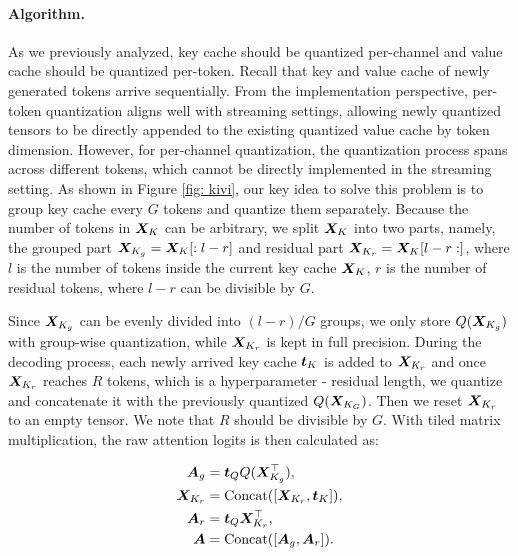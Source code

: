 \paragraph{Algorithm.}
As we previously analyzed, key cache should be quantized per-channel and value cache should be quantized per-token.
Recall that key and value cache of newly generated tokens arrive sequentially.
From the implementation perspective, per-token quantization aligns well with streaming settings, allowing newly quantized tensors to be directly appended to the existing quantized value cache by token dimension.
However, for per-channel quantization, the quantization process spans across different tokens, which cannot be directly implemented in the streaming setting.
As shown in Figure \ref{fig: kivi}, our key idea to solve this problem is to group key cache every $G$ tokens and quantize them separately. 
Because the number of tokens in ${\bm{X}}_K$ can be arbitrary, we split ${\bm{X}}_K$ into two parts, namely, the grouped part ${\bm{X}}_{K_g}={\bm{X}}_{K}[:l-r]$ and residual part ${\bm{X}}_{K_r}={\bm{X}}_{K}[l-r:]$, where $l$ is the number of tokens inside the current key cache ${\bm{X}}_K$, $r$ is the number of residual tokens, where $l-r$ can be divisible by $G$.

Since ${\bm{X}}_{K_g}$ can be evenly divided into $(l-r)/G$ groups, we only store $Q({\bm{X}}_{K_g})$ with group-wise quantization, while ${\bm{X}}_{K_r}$ is kept in full precision.
During the decoding process, each newly arrived key cache ${\bm{t}}_K$ is added to ${\bm{X}}_{K_r}$ and once ${\bm{X}}_{K_r}$ reaches $R$ tokens, which is a hyperparameter - residual length, we quantize and concatenate it with the previously quantized $Q({\bm{X}}_{K_G})$. 
Then we reset ${\bm{X}}_{K_r}$ to an empty tensor. We note that $R$ should be divisible by $G$.
With tiled matrix multiplication, the raw attention logits is then calculated as:

\vspace{-2em}
\begin{align}
{\bm{A}}_g &= {\bm{t}}_Q Q({\bm{X}}^{\top}_{K_g}), \nonumber \\
{\bm{X}}_{K_r} &= \text{Concat}([{\bm{X}}_{K_r}, {\bm{t}}_K]), \nonumber \\
{\bm{A}}_r &= {\bm{t}}_Q {\bm{X}}^{\top}_{K_r}, \nonumber \\
{\bm{A}} &= \text{Concat}([{\bm{A}}_g, {\bm{A}}_r]).
\label{eq: attquant}
\end{align}
\vspace{-2em}


